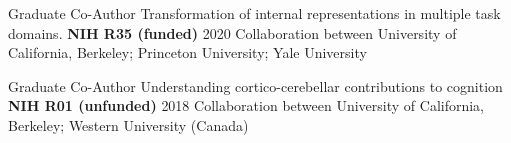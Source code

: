 \begin{cventries}

  \cventry
    {Graduate Co-Author} %
    {Transformation of internal representations in multiple task domains.} %
    {\textbf{NIH R35 (funded)}} %
    {2020} %
    {Collaboration between University of California, Berkeley; Princeton University; Yale University}

    
  \cventry
    {Graduate Co-Author} %
    {Understanding cortico-cerebellar contributions to cognition} %
    {\textbf{NIH R01 (unfunded)}} %
    {2018} %
    {Collaboration between University of California, Berkeley; Western University (Canada)}
    

\end{cventries}


